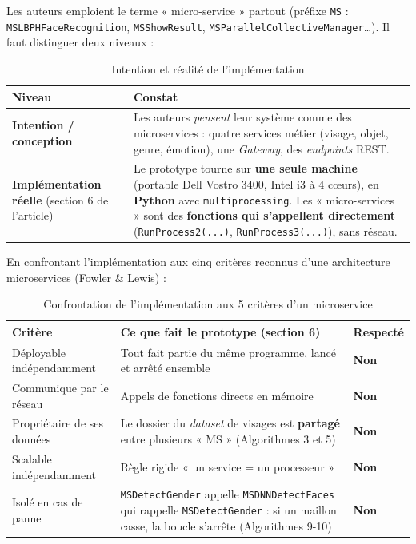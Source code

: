 \documentclass[11pt,a4paper]{article}
\begin{document}
Les auteurs emploient le terme « micro-service » partout (préfixe \texttt{MS} : \texttt{MSLBPHFaceRecognition}, \texttt{MSShowResult}, \texttt{MSParallelCollectiveManager}\ldots). Il faut distinguer deux niveaux :

\begin{table}[h]
\centering
\begin{tabular}{|p{3.4cm}|p{11.2cm}|}
\hline
\textbf{Niveau} & \textbf{Constat} \\
\hline
\textbf{Intention / conception} & Les auteurs \emph{pensent} leur système comme des microservices : quatre services métier (visage, objet, genre, émotion), une \textit{Gateway}, des \textit{endpoints} REST. \\
\hline
\textbf{Implémentation réelle} (section 6 de l'article) & Le prototype tourne sur \textbf{une seule machine} (portable Dell Vostro 3400, Intel i3 à 4 cœurs), en \textbf{Python} avec \texttt{multiprocessing}. Les « micro-services » sont des \textbf{fonctions qui s'appellent directement} (\texttt{RunProcess2(...)}, \texttt{RunProcess3(...)}), sans réseau. \\
\hline
\end{tabular}
\caption{Intention et réalité de l'implémentation}
\end{table}

En confrontant l'implémentation aux cinq critères reconnus d'une architecture microservices (Fowler \& Lewis) :

\begin{table}[h]
\centering
\begin{tabular}{|p{4.8cm}|p{6.4cm}|p{1.4cm}|}
\hline
\textbf{Critère} & \textbf{Ce que fait le prototype (section 6)} & \textbf{Respecté} \\
\hline
Déployable indépendamment & Tout fait partie du même programme, lancé et arrêté ensemble & \textbf{Non} \\
\hline
Communique par le réseau & Appels de fonctions directs en mémoire & \textbf{Non} \\
\hline
Propriétaire de ses données & Le dossier du \textit{dataset} de visages est \textbf{partagé} entre plusieurs « MS » (Algorithmes 3 et 5) & \textbf{Non} \\
\hline
Scalable indépendamment & Règle rigide « un service = un processeur » & \textbf{Non} \\
\hline
Isolé en cas de panne & \texttt{MSDetectGender} appelle \texttt{MSDNNDetectFaces} qui rappelle \texttt{MSDetectGender} : si un maillon casse, la boucle s'arrête (Algorithmes 9-10) & \textbf{Non} \\
\hline
\end{tabular}
\caption{Confrontation de l'implémentation aux 5 critères d'un microservice}
\end{table}
\end{document}
